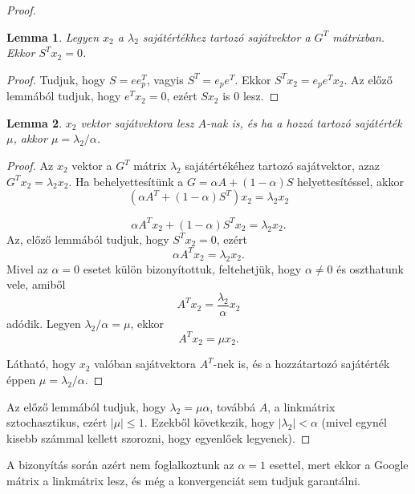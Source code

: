 \documentclass[12pt,a4paper]{article}
\newtheorem{lemma}{Lemma}
\begin{document}
\begin{proof}
	\begin{lemma}
		Legyen $x_2$ a $\lambda_2$ sajátértékhez tartozó sajátvektor a $G^T$ mátrixban. Ekkor $S^T x_2 = 0$.
	\end{lemma}
	\begin{proof}
		Tudjuk, hogy $S = e e_p^T$, vagyis $S^T = e_p e^T$. Ekkor $S^T x_2 = e_p e^T x_2$. Az előző lemmából tudjuk, hogy $e^T x_2 = 0$, ezért $S x_2$ is 0 lesz.
		\phantom\qedhere
	\end{proof}
	
	\begin{lemma}
		$x_2$ vektor sajátvektora lesz $A$-nak is, és ha a hozzá tartozó sajátérték $\mu$, akkor $\mu = \lambda_2 / \alpha$. 
	\end{lemma}
    \begin{proof}
    	Az $x_2$ vektor a $G^T$ mátrix $\lambda_2$ sajátértékéhez tartozó sajátvektor, azaz $G^T x_2 = \lambda_2 x_2$. Ha behelyettesítünk a $G = \alpha A + (1-\alpha)S$ helyettesítéssel, akkor
    	\[ (\alpha A^T + (1-\alpha) S^T ) x_2 = \lambda_2 x_2 \]
    	
    	\[ \alpha A^T x_2 + (1-\alpha) S^T x_2 = \lambda_2 x_2. \]
    	Az, előző lemmából tudjuk, hogy $S^T x_2 = 0$, ezért 
    	\[ \alpha A^T x_2 = \lambda_2 x_2. \]
    	Mivel az $\alpha = 0$ esetet külön bizonyítottuk, feltehetjük, hogy $\alpha \neq 0$ és oszthatunk vele, amiből
    	\[ A^T x_2 = \frac{\lambda_2}{\alpha} x_2 \]
    	adódik. Legyen $\lambda_2/\alpha = \mu$, ekkor
    	\[ A^T x_2 = \mu x_2. \]

    	Látható, hogy $x_2$ valóban sajátvektora $A^T$-nek is, és a hozzátartozó sajátérték éppen $\mu = \lambda_2/\alpha$.
    	\phantom\qedhere
    \end{proof}
	
	Az előző lemmából tudjuk, hogy $\lambda_2 = \mu \alpha$, továbbá $A$, a linkmátrix sztochasztikus, ezért $|\mu| \leq 1$. Ezekből következik, hogy $ |\lambda_2| < \alpha $ (mivel egynél kisebb számmal kellett szorozni, hogy egyenlőek legyenek).
\end{proof}

A bizonyítás során azért nem foglalkoztunk az $\alpha = 1$ esettel, mert ekkor a Google mátrix a linkmátrix lesz, és még a konvergenciát sem tudjuk garantálni.
\end{document}

